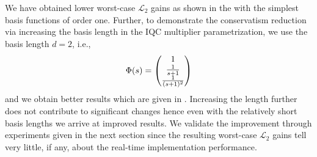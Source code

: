 We have obtained lower worst-case $\mathcal{L}_2$ gains as shown in the  with the simplest basis functions
of order one. Further, to demonstrate the conservatism reduction via increasing the basis length in the IQC multiplier parametrization,
 we use the basis length $d=2$, i.e.,
\[
\Phi(s) = \begin{pmatrix}1\\\frac{1}{s+1}\\\frac{1}{(s+1)^2}\end{pmatrix}
\]
and we obtain better results which are given in . Increasing the length further does not contribute to 
significant changes hence even with the relatively short basis lengths we arrive at improved results. We validate the improvement 
through experiments given in the next section since the resulting worst-case $\mathcal{L}_2$ gains tell very little, if any, about 
the real-time implementation performance. 


\designtwodataone

\designtwodatadtwo


